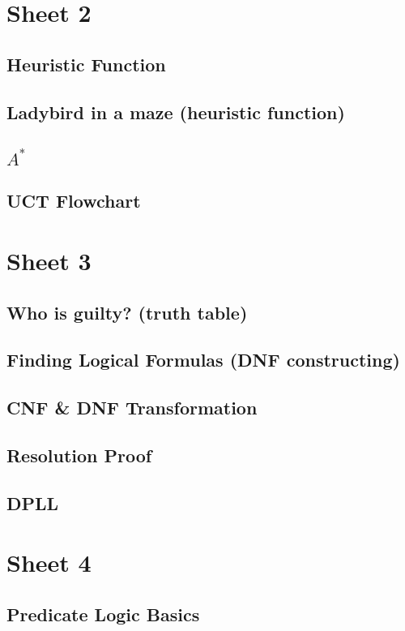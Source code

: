 \documentclass{article}
\begin{document}
\section{Sheet 2}
    \subsection{Heuristic Function}
    \subsection{Ladybird in a maze (heuristic function)}
    \subsection{$A^*$}
    \subsection{UCT Flowchart}
    

\section{Sheet 3}
    \subsection{Who is guilty? (truth table)}
    \subsection{Finding Logical Formulas (DNF constructing)}
    \subsection{CNF & DNF Transformation}
    \subsection{Resolution Proof}
    \subsection{DPLL}
    

\section{Sheet 4}
    \subsection{Predicate Logic Basics}
\end{document}
